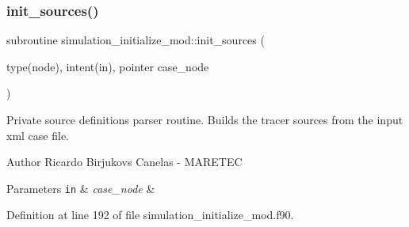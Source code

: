 \subsubsection{\texorpdfstring{init\+\_\+sources()}{init\_sources()}}
{\footnotesize\ttfamily subroutine simulation\+\_\+initialize\+\_\+mod\+::init\+\_\+sources (\begin{DoxyParamCaption}\item[{type(node), intent(in), pointer}]{case\+\_\+node }\end{DoxyParamCaption})\hspace{0.3cm}{\ttfamily [private]}}



Private source definitions parser routine. Builds the tracer sources from the input xml case file. 

\begin{DoxyAuthor}{Author}
Ricardo Birjukovs Canelas -\/ M\+A\+R\+E\+T\+EC 
\end{DoxyAuthor}

\begin{DoxyParams}[1]{Parameters}
\mbox{\tt in}  & {\em case\+\_\+node} & \\
\hline
\end{DoxyParams}


Definition at line 192 of file simulation\+\_\+initialize\+\_\+mod.\+f90.


